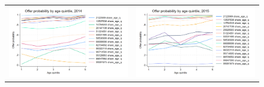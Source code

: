 \documentclass[12pt]{article}
\begin{document}
\begin{figure}[H] 
\caption{}
\label{fig:ie3_16}
\centering{}%
\begin{tabular}{cc}
\includegraphics[scale=0.27]{../figures/IE3_supply_offerprob_age_q_2014.png} &
\includegraphics[scale=0.27]{../figures/IE3_supply_offerprob_age_q_2015.png}
\end{tabular}
\end{figure}
\end{document}
